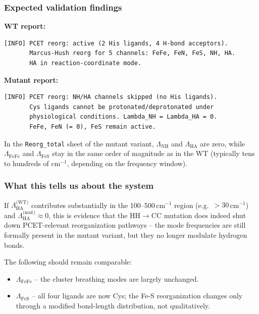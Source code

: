 \documentclass[11pt,a4paper,twoside]{article}
\theoremstyle{remark}
\begin{document}
\subsubsection*{Expected validation findings}

\textbf{WT report:}

\begin{lstlisting}[style=bash]
[INFO] PCET reorg: active (2 His ligands, 4 H-bond acceptors).
       Marcus-Hush reorg for 5 channels: FeFe, FeN, FeS, NH, HA.
       HA in reaction-coordinate mode.
\end{lstlisting}

\textbf{Mutant report:}

\begin{lstlisting}[style=bash]
[INFO] PCET reorg: NH/HA channels skipped (no His ligands).
       Cys ligands cannot be protonated/deprotonated under
       physiological conditions. Lambda_NH = Lambda_HA = 0.
       FeFe, FeN (= 0), FeS remain active.
\end{lstlisting}

In the \texttt{Reorg\_total} sheet of the mutant variant,
$\Lambda_\text{NH}$ and $\Lambda_\text{HA}$ are zero, while
$\Lambda_\text{FeFe}$ and $\Lambda_\text{FeS}$ stay in the same
order of magnitude as in the WT (typically tens to hundreds of
cm$^{-1}$, depending on the frequency window).

\subsubsection*{What this tells us about the system}

If $\Lambda_\text{HA}^\text{(WT)}$ contributes substantially in
the 100--500\,cm$^{-1}$ region (e.g.\ $> 30$\,cm$^{-1}$) and
$\Lambda_\text{HA}^\text{(mut)} \approx 0$, this is evidence that
the HH$\to$CC mutation does indeed shut down PCET-relevant
reorganization pathways -- the mode frequencies are still formally
present in the mutant variant, but they no longer modulate
hydrogen bonds.

The following should remain comparable:
\begin{itemize}
  \item $\Lambda_\text{FeFe}$ -- the cluster breathing modes are
        largely unchanged.
  \item $\Lambda_\text{FeS}$ -- all four ligands are now Cys; the
        Fe-S reorganization changes only through a modified
        bond-length distribution, not qualitatively.
\end{itemize}
\end{document}
